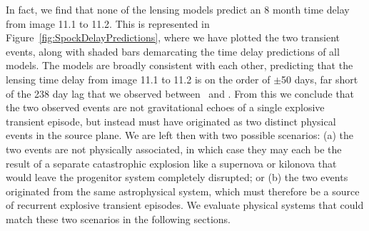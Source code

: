 In fact, we find that none of the lensing models predict an 8 month time delay from image 11.1 to 11.2.  This is represented in Figure~\ref{fig:SpockDelayPredictions}, where we have plotted the two transient events, along with shaded bars demarcating the time delay predictions of all models.   The models are broadly consistent with each other, predicting that the lensing time delay from image 11.1 to 11.2 is on the order of $\pm$50 days, far short of the 238 day lag that we observed between \spockone\ and \spocktwo.  From this we conclude that the two observed events are not gravitational echoes of a single explosive transient episode, but instead must have originated as two distinct physical events in the source plane.  We are left then with two possible scenarios: (a) the two events are not physically associated, in which case they may each be the result of a separate catastrophic explosion like a supernova or kilonova that would leave the progenitor system completely disrupted; or (b) the two events originated from the same astrophysical system, which must therefore be a source of recurrent explosive transient episodes.   We evaluate physical systems that could match these two scenarios in the following sections.

